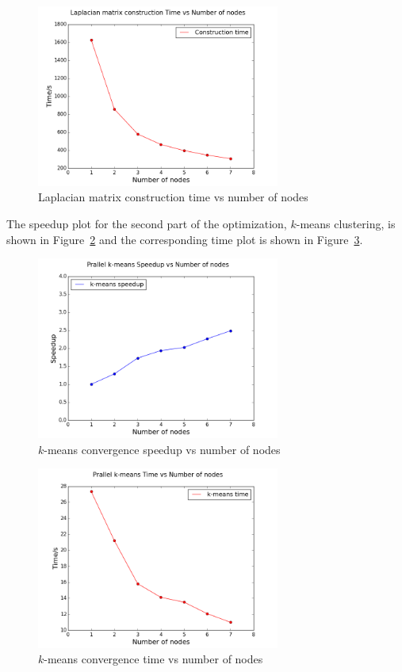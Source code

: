 \documentclass{acm_proc_article-sp}
\begin{document}
\begin{figure}[ht]
\centering
\includegraphics[height=6cm]{mt.png}
\caption{Laplacian matrix construction time vs number of nodes}
\label{lm_time}
\end{figure}

The speedup plot for the second part of the optimization, $k$-means clustering, is shown in Figure~\ref{km_speedup} and the corresponding time plot is shown in Figure~\ref{km_time}.

\begin{figure}[ht]
\centering
\includegraphics[height=6cm]{ks.png}
\caption{$k$-means convergence speedup vs number of nodes}
\label{km_speedup}
\end{figure}

\begin{figure}[ht]
\centering
\includegraphics[height=6cm]{kt.png}
\caption{$k$-means convergence time vs number of nodes}
\label{km_time}
\end{figure}
\end{document}
